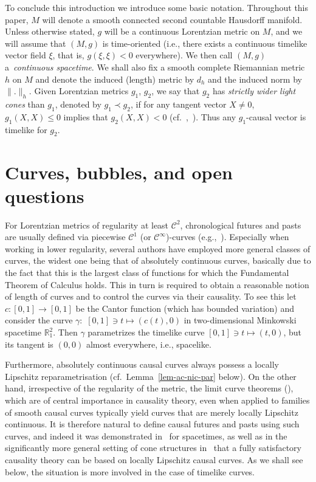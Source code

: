 \documentclass[reqno]{amsart}
\numberwithin{equation}{section}
\theoremstyle{plain}
\theoremstyle{definition}
\theoremstyle{remark}
\newcommand\R{\ensuremath{\mathbb{R}}}
\renewcommand\le{\leqslant}
\begin{document}
To conclude this introduction we introduce some basic notation. Throughout this paper, $M$ will denote a smooth connected 
second countable Hausdorff manifold. Unless otherwise stated, $g$ will be a continuous Lorentzian metric on $M$, and we will 
assume that $(M,g)$ is time-oriented (i.e., there exists a continuous timelike vector field $\xi$, that is, $g(\xi,\xi)<0$ 
everywhere). We then call $(M,g)$ a~\emph{continuous spacetime}. We shall also fix a smooth complete Riemannian metric $h$ on $M$ 
and denote the induced (length) metric by $d_h$ and the induced norm by $\|.\|_h$. Given Lorentzian metrics $g_1$, $g_2$, we 
say that $g_2$ has \emph{strictly wider light cones\/} than $g_1$, denoted by $g_1\prec g_2$, if for any tangent vector $X 
\neq 0$, $g_1(X,X) \le 0$ implies that $g_2(X,X)<0$ (cf.~\cite[Sec.\ 3.8.2]{MS:08},~\cite[Sec.\ 1.2]{CG:12}). Thus any 
$g_1$-causal vector is timelike for $g_2$.

\section{Curves, bubbles, and open questions}\label{sec_basic}

For Lorentzian metrics of regularity at least $\mathcal{C}^2$, chronological futures and pasts are usually defined via 
piecewise $\mathcal{C}^1$ (or $\mathcal{C}^\infty$)-curves (e.g.,~\cite{HE:73,ONe:83,BEE:96,MS:08}). Especially when working in lower 
regularity, several authors have employed more general classes of curves, the widest one being that of absolutely continuous 
curves, basically due to the fact that this is the largest class of functions for which the Fundamental Theorem of Calculus 
holds. This in turn is required to obtain a reasonable notion of length of curves and to control the curves via their causality.  
To see this let $c\colon[0,1]\rightarrow [0,1]$ be the Cantor function (which has bounded variation) and consider 
the curve $\gamma:$ $[0,1]\ni t\mapsto (c(t),0)$ in two-dimensional Minkowski spacetime $\R^2_1$. Then $\gamma$ parametrizes 
the timelike curve $[0,1]\ni t\mapsto (t,0)$, but its tangent is $(0,0)$ almost everywhere, i.e., spacelike.

Furthermore, absolutely continuous causal curves always possess a locally Lipschitz reparametrisation (cf.\ Lemma~\ref{lem-ac-nic-par} below). On the other hand,
irrespective of the regularity of the metric, the limit curve theorems (\cite{Min:08a}), which are of central importance in 
causality theory, even when applied to families of smooth causal curves typically yield curves that are merely locally 
Lipschitz continuous. 
It is therefore natural to define causal futures and pasts using such curves, and indeed
it was demonstrated in~\cite{Chr:11,CG:12,Min:15,KSSV:14} for spacetimes, as well as in the significantly more general setting of cone structures in~\cite{FS:12,BS:18,Min:19} that a fully satisfactory causality theory can be based on locally Lipschitz causal curves. As we shall see below, 
the situation is more involved in the case of timelike curves. 
 
\end{document}
